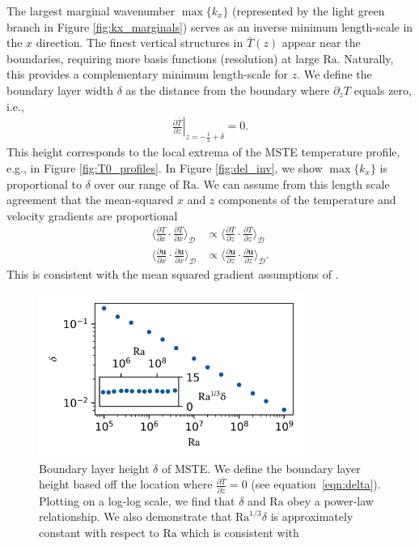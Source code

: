 \documentclass[reprint,amsmath,amssymb,aps]{revtex4-1}
\newcommand\Ra{\mathrm{Ra}}
\renewcommand{\vec}[1]{\boldsymbol{#1}}
\begin{document}
The largest marginal wavenumber $\max \{ k_x \}$ (represented by the light green branch in Figure \ref{fig:kx_marginals}) serves as an inverse minimum length-scale in the $x$ direction.
The finest vertical structures in $\bar{T}(z)$ appear near the boundaries, requiring more basis functions (resolution) at large $\Ra$.
Naturally, this provides a complementary minimum length-scale for $z$.
We define the boundary layer width $\delta$ as the distance from the boundary where $\partial_z T$ equals zero, i.e.,
\begin{align}\label{eqn:delta}
\left.\frac{\partial \bar{T}}{\partial z}\right|_{z=-\frac{1}{2}+\delta} = 0.
\end{align}
This height corresponds to the local extrema of the MSTE temperature profile, e.g., in Figure \ref{fig:T0_profiles}.
In Figure \ref{fig:del_inv}, we show $\max \{ k_x\}$ is proportional to $\delta$ over our range of $\Ra$.
We can assume from this length scale agreement that the mean-squared $x$ and $z$ components of the temperature and velocity gradients are proportional
\begin{align*}
    \Big\langle \frac{\partial T}{\partial x} \cdot \frac{\partial T}{\partial x} \Big\rangle_{\mathcal{D}} &\propto \Big\langle \frac{\partial T}{\partial z} \cdot \frac{\partial T}{\partial z} \Big\rangle_{\mathcal{D}}    \\
    \Big\langle \frac{\partial \vec{u}}{\partial x} \cdot \frac{\partial \vec{u}}{\partial x} \Big\rangle_{\mathcal{D}} &\propto \Big\langle \frac{\partial \vec{u}}{\partial z} \cdot \frac{\partial \vec{u}}{\partial z} \Big\rangle_{\mathcal{D}}.
\end{align*}
This is consistent with the mean squared gradient assumptions of \cite{Malkus_1954}.

\begin{figure}
    \centering
    \includegraphics[width=3.4in]{del_ra.PNG}
    \caption{Boundary layer height $\delta$ of MSTE. 
    We define the boundary layer height based off the location where $\frac{\partial \bar{T}}{\partial z} = 0$ (see equation~\ref{eqn:delta}). 
    Plotting on a log-log scale, we find that $\delta$ and $\Ra$ obey a power-law relationship. We also demonstrate that $\Ra^{1/3}\delta$ is approximately constant with respect to $\Ra$ which is consistent with \cite{Malkus_1954}}
    \label{fig:bl_ra}
\end{figure}
\end{document}
